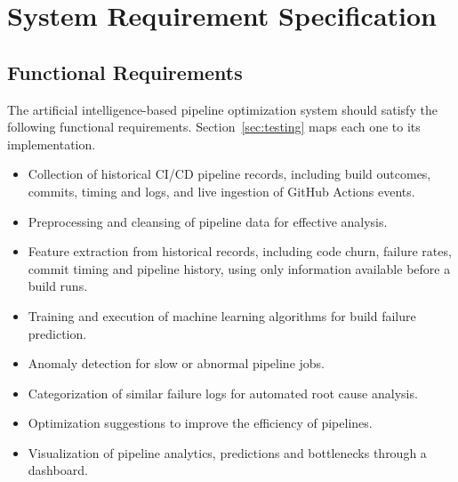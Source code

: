 \chapter{System Requirement Specification}
\label{ch:srs}

\section{Functional Requirements}
\label{sec:functional}
The artificial intelligence-based pipeline optimization system should satisfy the following functional requirements. Section~\ref{sec:testing} maps each one to its implementation.
\begin{itemize}
\item Collection of historical CI/CD pipeline records, including build outcomes, commits, timing and logs, and live ingestion of GitHub Actions events.
\item Preprocessing and cleansing of pipeline data for effective analysis.
\item Feature extraction from historical records, including code churn, failure rates, commit timing and pipeline history, using only information available before a build runs.
\item Training and execution of machine learning algorithms for build failure prediction.
\item Anomaly detection for slow or abnormal pipeline jobs.
\item Categorization of similar failure logs for automated root cause analysis.
\item Optimization suggestions to improve the efficiency of pipelines.
\item Visualization of pipeline analytics, predictions and bottlenecks through a dashboard.
\end{itemize}

